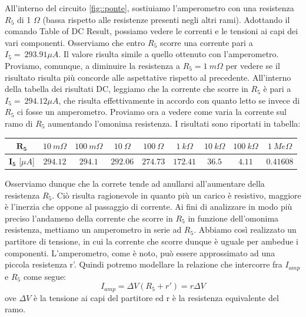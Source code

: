 All'interno del circuito \ref{fig::ponte}, sostiuiamo l'amperometro con una resistenza $R_5$ di 1 $\Omega$ (bassa rispetto alle resistenze presenti negli altri rami). Adottando il comando Table of DC Result, possiamo vedere le correnti e le tensioni ai capi dei vari componenti. Osserviamo che entro $R_5$ scorre una corrente pari a $I_{5} = \: 293.91 \mu A$.
Il valore risulta simile a quello ottenuto con l'amperometro. Proviamo, comunque, a diminuire la resistenza a $R_{5} = 1 \: m\Omega$ per vedere se il risultato risulta più concorde alle aspettative rispetto al precedente. All'interno della tabella dei risultati DC, leggiamo che la corrente che scorre in $R_5$ è pari a $I_{5} = \: 294.12 \mu A$, che risulta effettivamente in accordo con quanto letto se invece di $R_5$ ci fosse un amperometro.
Proviamo ora a vedere come varia la corrente sul ramo di $R_5$ aumentando l'omonima resistenza. I risultati sono riportati in tabella:
\begin{center}
\begin{tabular}{|c|c|c|c|c|c|c|c|c|}
\hline
$\textbf{R}_{\textbf{5}}$         &$10 \: m\Omega$        &$100 \: m\Omega$         &$10 \: \Omega$         &$100 \: \Omega$         &$1 \: k\Omega$         &$10 \: k\Omega$         &$100 \: k\Omega$         &$1 \: Me\Omega$     \\
\hline
$\textbf{I}_{\textbf{5}}$ [$\mu A$]         &$294.12$        &$294.1$         &$292.06$         &$274.73$         &$172.41$         &$36.5$         &$4.11$         &$0.41608$    \\
\hline
\end{tabular}
\end{center}
Osserviamo dunque che la correte tende ad anullarsi all'aumentare della resistenza $R_5$. Ciò risulta ragionevole in quanto più un carico è resistivo, maggiore è l'inerzia che oppone al passaggio di corrente.
Ai fini di analizzare in modo più preciso l'andameno della corrente che scorre in $R_5$ in funzione dell'omonima resistenza, mettiamo un amperometro in serie ad $R_5$. Abbiamo così realizzato un partitore di tensione, in cui la corrente che scorre dunque è uguale per ambedue i componenti. L'amperometro, come è noto, può essere approssimato ad una piccola resistenza r'. Quindi potremo modellare la relazione che intercorre fra $I_{amp}$ e $R_5$ come segue:
\begin{equation}
    I_{amp} = \Delta V (R_5 + r') = r \Delta V
\end{equation}
ove $\Delta V$ è la tensione ai capi del partitore ed r è la resistenza equivalente del ramo.
